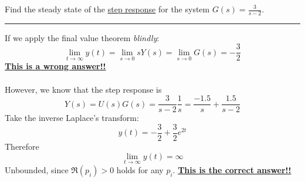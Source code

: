 \begin{ex}{}
    Find the steady state of the \underline{step response} for the system $\displaystyle G(s)=\frac{3}{s-2}$.
    \vspace{.3cm} \hrule \vspace{.3cm}
    If we apply the final value theorem \textit{blindly}:
    \[\lim_{t\to \infty}y(t) = \lim_{s\to 0}sY(s)=\lim_{s\to 0}G(s)=-\frac{3}{2}\]
    \underline{\textbf{This is a wrong answer!!}}
    \\\\
    However, we know that the step response is
    \[Y(s) =U(s)G(s)= \frac{3}{s-2}\frac{1}{s}=\frac{-1.5}{s}+\frac{1.5}{s-2}\]
    Take the inverse Laplace's transform:
    \[y(t) = -\frac{3}{2}+\frac{3}{2}e^{2t}\]
    Therefore
    \[\lim_{t\to \infty}y(t) = \infty\]
    Unbounded, since $\Re (p_{i})>0$ holds for any $p_{i}$.
    \underline{\textbf{This is the correct answer!!}}
\end{ex}
